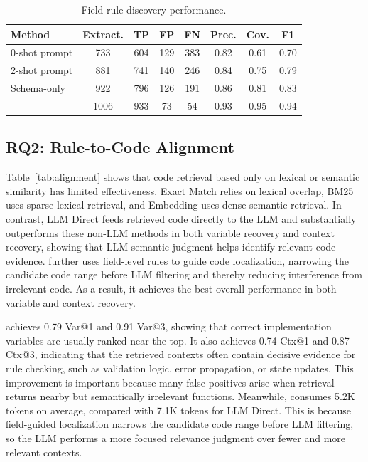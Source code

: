 \begin{table}[t]
\centering
\caption{Field-rule discovery performance.}
\label{tab:field-rule-statistics}
\setlength{\tabcolsep}{3pt}
\begin{tabular}{lccccccc}
\toprule
\textbf{Method} & \textbf{Extract.} & \textbf{TP} & \textbf{FP} & \textbf{FN}
& \textbf{Prec.} & \textbf{Cov.} & \textbf{F1} \\
\midrule
0-shot prompt  & 733  & 604 & 129 & 383 & 0.82 & 0.61 & 0.70 \\
2-shot prompt  & 881  & 741 & 140 & 246 & 0.84 & 0.75 & 0.79 \\
Schema-only   & 922  & 796 & 126 & 191 & 0.86 & 0.81 & 0.83 \\
\tool{}       & 1006 & 933 & 73  & 54  & 0.93 & 0.95 & 0.94 \\
\bottomrule
\end{tabular}
\end{table}

\subsection{RQ2: Rule-to-Code Alignment}

Table~\ref{tab:alignment} shows that code retrieval based only on lexical or
semantic similarity has limited effectiveness. Exact Match relies on lexical
overlap, BM25 uses sparse lexical retrieval, and Embedding uses dense semantic
retrieval. In contrast, LLM Direct feeds retrieved code directly to the LLM and
substantially outperforms these non-LLM methods in both variable recovery and
context recovery, showing that LLM semantic judgment helps identify relevant
code evidence. \tool{} further uses field-level rules to guide code
localization, narrowing the candidate code range before LLM filtering and
thereby reducing interference from irrelevant code. As a result, it achieves
the best overall performance in both variable and context recovery.

\tool{} achieves 0.79 Var@1 and 0.91 Var@3, showing that correct
implementation variables are usually ranked near the top. It also achieves
0.74 Ctx@1 and 0.87 Ctx@3, indicating that the retrieved contexts often contain
decisive evidence for rule checking, such as validation logic, error
propagation, or state updates. This improvement is important because many false
positives arise when retrieval returns nearby but semantically irrelevant
functions. Meanwhile, \tool{} consumes 5.2K tokens on average, compared with
7.1K tokens for LLM Direct. This is because field-guided localization narrows
the candidate code range before LLM filtering, so the LLM performs a more
focused relevance judgment over fewer and more relevant contexts.

